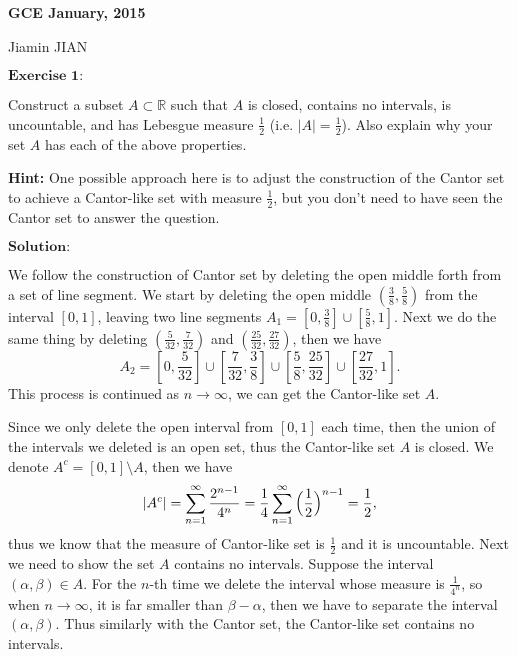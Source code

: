 \documentclass[12pt,a4paper]{ctexart}
\begin{document}
\begin{center}
\textbf{ GCE January, 2015}
\vspace{8pt}

Jiamin JIAN
\end{center}

\vspace{12pt}

$\textbf{Exercise 1:}$

Construct a subset $A \subset \mathbb{R}$ such that $A$ is closed, contains no intervals, is uncountable, and has Lebesgue measure $\frac{1}{2}$ (i.e. $|A| = \frac{1}{2}$). Also explain why your set $A$ has each of the above properties.

\textbf{Hint:} One possible approach here is to adjust the construction of the Cantor set to achieve a Cantor-like set with measure $\frac{1}{2}$, but you don't need to have seen the Cantor set to answer the question.

\vspace{8pt}

$\textbf{Solution:}$

We follow the construction of Cantor set by deleting the open middle forth from a set of line segment. We start by deleting the open middle $(\frac{3}{8}, \frac{5}{8})$ from the interval $[0, 1]$, leaving two line segments $A_{1} = [0, \frac{3}{8}] \cup [\frac{5}{8}, 1]$. Next we do the same thing by deleting $(\frac{5}{32}, \frac{7}{32})$ and $(\frac{25}{32}, \frac{27}{32})$, then we have
\begin{equation*}
    A_{2} = [0, \frac{5}{32}] \cup [\frac{7}{32}, \frac{3}{8}] \cup [\frac{5}{8}, \frac{25}{32}] \cup [\frac{27}{32}, 1].
\end{equation*}
This process is continued as $n \to \infty$, we can get the Cantor-like set $A$.

Since we only delete the open interval from $[0, 1]$ each time, then the union of the intervals we deleted is an open set, thus the Cantor-like set $A$ is closed. We denote $A^{c} = [0, 1] \setminus A$, then we have
\begin{equation*}
    |A^{c}| = \sum_{n = 1}^{\infty} \frac{2^{n-1}}{4^{n}} = \frac{1}{4}  \sum_{n = 1}^{\infty} \Big{(} \frac{1}{2} \Big{)}^{n -1} = \frac{1}{2},
\end{equation*}
thus we know that the measure of Cantor-like set is $\frac{1}{2}$ and it is uncountable. Next we need to show the set $A$ contains no intervals. Suppose the interval $(\alpha, \beta) \in A$. For the $n$-th time we delete the interval whose measure is $\frac{1}{4^{n}}$, so when $n \to \infty$, it is far smaller than $\beta - \alpha$, then we have to separate the interval $(\alpha, \beta)$. Thus similarly with the Cantor set, the Cantor-like set contains no intervals. 
\end{document}
